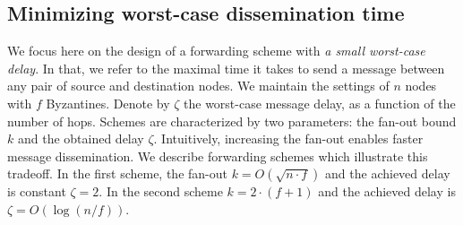 
\subsection{Minimizing worst-case dissemination time}
We focus here on the design of a forwarding scheme with \emph{a small worst-case delay}. In that, we refer to the maximal time it takes to send a message between any pair of source and destination nodes. We maintain the settings of $n$ nodes with $f$ Byzantines. %
Denote by $\zeta$ the worst-case message delay, as a function of the number of hops.
Schemes are characterized by two parameters: the fan-out bound $k$  and the obtained delay $\zeta$. Intuitively, increasing the fan-out enables faster message dissemination. 
We describe forwarding schemes which illustrate this tradeoff. In the first scheme, the fan-out $k = O(\sqrt{n \cdot f})$ and the achieved delay is constant $\zeta=2$. In the second scheme $k=2 \cdot (f+1)$ and the achieved delay is $\zeta = O(\log({n/f}))$.


